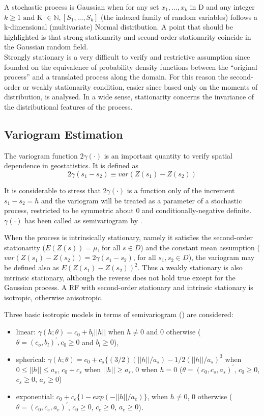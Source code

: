 \documentclass[
  12pt]{article}
\providecommand{\tightlist}{%
  \setlength{\itemsep}{0pt}\setlength{\parskip}{0pt}}\usepackage{longtable,booktabs,array}
\begin{document}
A stochastic process is Gaussian when for any set \(x_1,..., x_k\) in D
and any integer
\(k \geq 1 \text{ and K } \in \mathbb{N},[S_1,..., S_k ]\) (the indexed
family of random variables) follows a k-dimensional (multivariate)
Normal distribution. A point that should be highlighted is that strong
stationarity and second-order stationarity coincide in the Gaussian
random field.\\
Strongly stationary is a very difficult to verify and restrictive
assumption since founded on the equivalence of probability density
functions between the ``original process'' and a translated process
along the domain. For this reason the second-order or weakly
stationarity condition, easier since based only on the moments of
distribution, is analysed. In a wide sense, stationarity concerns the
invariance of the distributional features of the process.

\subsection{Variogram Estimation}\label{variogram-estimation}

The variogram function \(2\gamma(\cdot)\) is an important quantity to
verify spatial dependence in geostatistics. It is defined as\\
\[2\gamma(s_1-s_2)\equiv var(Z(s_1)-Z(s_2))\]

It is considerable to stress that \(2\gamma(\cdot)\) is a function only
of the increment \(s_1 - s_2=h\) and the variogram will be treated as a
parameter of a stochastic process, restricted to be symmetric about 0
and conditionally-negative definite. \(\gamma(\cdot)\) has been called
as semivariogram by \citet{mat:1962}.

When the process is intrinsically stationary, namely it satisfies the
second-order stationarity (\(E(Z(s))=\mu\), for all \(s\in D\)) and the
constant mean assumption (\(var(Z(s_1)-Z(s_2))=2\gamma(s_1-s_2)\), for
all \(s_1,s_2 \in D\)), the variogram may be defined also as
\(E(Z(s_1)-Z(s_2))^2\). Thus a weakly stationary is also intrinsic
stationary, although the reverse does not hold true except for the
Gaussian process. A RF with second-order stationary and intrinsic
stationary is isotropic, otherwise anisotropic.

Three basic isotropic models in terms of semivariogram (\citet{ag:1978})
are considered:

\begin{itemize}
\tightlist
\item
  linear: \(\gamma(h;\theta)=c_0+b_l||h||\) when \(h \neq 0\) and \(0\)
  otherwise (\(\theta=(c_o,b_l)^{\prime}, c_0 \geq 0\) and
  \(b_l \geq 0\)),
\item
  spherical:
  \(\gamma(h;\theta)=c_0+c_s\{(3/2)(||h||/a_{s})-1/2(||h||/a_{s})^3\)
  when \(0\leq ||h|| \leq a_s\), \(c_0+c_s\) when \(||h|| \geq a_s\),
  \(0\) when \(h=0\) (\(\theta=(c_0, c_s, a_s)^{\prime}\),
  \(c_0 \geq0\), \(c_s \geq 0\), \(a_s \geq 0\))
\item
  exponential: \(c_0+c_e\{1-exp(-||h||/a_{e})\}\), when \(h\neq0\),
  \(0\) otherwise (\(\theta=(c_0,c_e,a_e)^{\prime}\), \(c_0 \geq 0\),
  \(c_e \geq 0\), \(a_e \geq 0\)).
\end{itemize}
\end{document}
